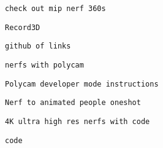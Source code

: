 \begin{verbatim}
check out mip nerf 360s
\end{verbatim}
       

       
       
        \protect\hypertarget{ID_369564702}{}{}

\begin{verbatim}
Record3D
\end{verbatim}
       

       
       
        \protect\hypertarget{ID_1651809442}{}{}

\begin{verbatim}
github of links
\end{verbatim}
       

       
       
        \protect\hypertarget{ID_1433274364}{}{}

\begin{verbatim}
nerfs with polycam
\end{verbatim}

         
         
          \protect\hypertarget{ID_947586574}{}{}

\begin{verbatim}
Polycam developer mode instructions
\end{verbatim}
         
       

       
       
        \protect\hypertarget{ID_956210623}{}{}

\begin{verbatim}
Nerf to animated people oneshot
\end{verbatim}
       

       
       
        \protect\hypertarget{ID_373426679}{}{}

\begin{verbatim}
4K ultra high res nerfs with code
\end{verbatim}

         
         
          \protect\hypertarget{ID_1891370674}{}{}

\begin{verbatim}
code
\end{verbatim}
         
       

       
       
